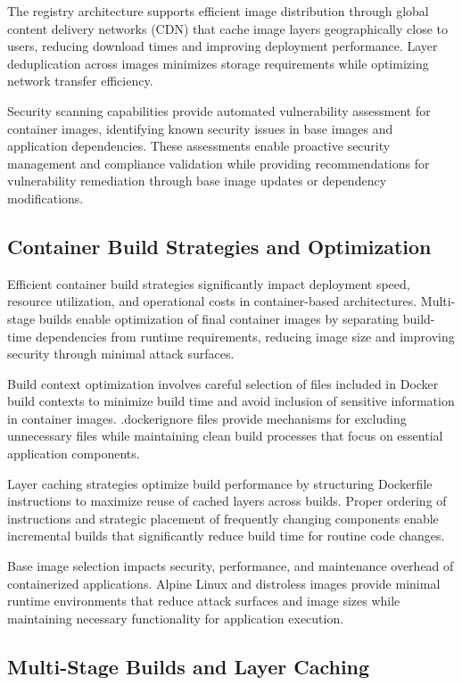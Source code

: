 The registry architecture supports efficient image distribution through global content delivery networks (CDN) that cache image layers geographically close to users, reducing download times and improving deployment performance. Layer deduplication across images minimizes storage requirements while optimizing network transfer efficiency.

Security scanning capabilities provide automated vulnerability assessment for container images, identifying known security issues in base images and application dependencies. These assessments enable proactive security management and compliance validation while providing recommendations for vulnerability remediation through base image updates or dependency modifications.

\subsection{Container Build Strategies and Optimization}

Efficient container build strategies significantly impact deployment speed, resource utilization, and operational costs in container-based architectures. Multi-stage builds enable optimization of final container images by separating build-time dependencies from runtime requirements, reducing image size and improving security through minimal attack surfaces.

Build context optimization involves careful selection of files included in Docker build contexts to minimize build time and avoid inclusion of sensitive information in container images. .dockerignore files provide mechanisms for excluding unnecessary files while maintaining clean build processes that focus on essential application components.

Layer caching strategies optimize build performance by structuring Dockerfile instructions to maximize reuse of cached layers across builds. Proper ordering of instructions and strategic placement of frequently changing components enable incremental builds that significantly reduce build time for routine code changes.

Base image selection impacts security, performance, and maintenance overhead of containerized applications. Alpine Linux and distroless images provide minimal runtime environments that reduce attack surfaces and image sizes while maintaining necessary functionality for application execution.

\subsection{Multi-Stage Builds and Layer Caching}


